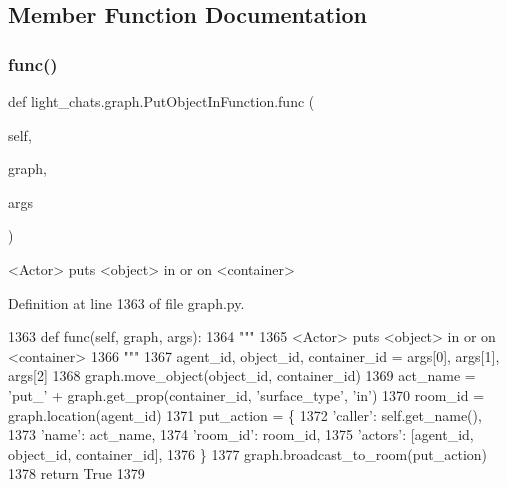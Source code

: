 \subsection{Member Function Documentation}
\mbox{\label{classlight__chats_1_1graph_1_1PutObjectInFunction_a9f97c240b7308feca19fe4adb63a64f3}} 
\subsubsection{\texorpdfstring{func()}{func()}}
{\footnotesize\ttfamily def light\+\_\+chats.\+graph.\+Put\+Object\+In\+Function.\+func (\begin{DoxyParamCaption}\item[{}]{self,  }\item[{}]{graph,  }\item[{}]{args }\end{DoxyParamCaption})}

\begin{DoxyVerb}<Actor> puts <object> in or on <container>
\end{DoxyVerb}
 

Definition at line 1363 of file graph.\+py.


\begin{DoxyCode}
1363     \textcolor{keyword}{def }func(self, graph, args):
1364         \textcolor{stringliteral}{"""}
1365 \textcolor{stringliteral}{        <Actor> puts <object> in or on <container>}
1366 \textcolor{stringliteral}{        """}
1367         agent\_id, object\_id, container\_id = args[0], args[1], args[2]
1368         graph.move\_object(object\_id, container\_id)
1369         act\_name = \textcolor{stringliteral}{'put\_'} + graph.get\_prop(container\_id, \textcolor{stringliteral}{'surface\_type'}, \textcolor{stringliteral}{'in'})
1370         room\_id = graph.location(agent\_id)
1371         put\_action = \{
1372             \textcolor{stringliteral}{'caller'}: self.get\_name(),
1373             \textcolor{stringliteral}{'name'}: act\_name,
1374             \textcolor{stringliteral}{'room\_id'}: room\_id,
1375             \textcolor{stringliteral}{'actors'}: [agent\_id, object\_id, container\_id],
1376         \}
1377         graph.broadcast\_to\_room(put\_action)
1378         \textcolor{keywordflow}{return} \textcolor{keyword}{True}
1379 
\end{DoxyCode}
\mbox{\label{classlight__chats_1_1graph_1_1PutObjectInFunction_a634d7e2b36ebdc9b626e32811fabca00}} 
